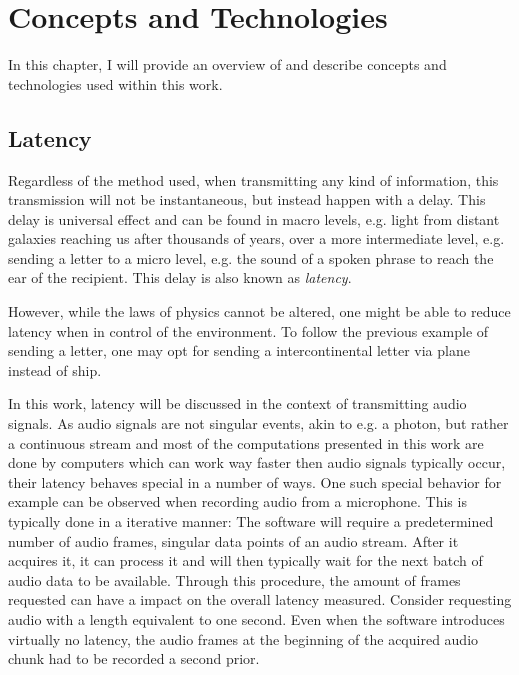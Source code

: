 

\chapter{Concepts and Technologies}
\label{basics:start}
In this chapter, I will provide an overview of and describe concepts and technologies used within this work.



\section{Latency}
\label{basics:latency}
Regardless of the method used, when transmitting any kind of information, this transmission will not be instantaneous, but instead happen with a delay.
This delay is universal effect and can be found in macro levels, e.g. light from distant galaxies reaching us after thousands of years, over a more intermediate level, e.g. sending a letter to a micro level, e.g. the sound of a spoken phrase to reach the ear of the recipient.
This delay is also known as \textit{latency}.

However, while the laws of physics cannot be altered, one might be able to reduce latency when in control of the environment.
To follow the previous example of sending a letter, one may opt for sending a intercontinental letter via plane instead of ship.

In this work, latency will be discussed in the context of transmitting audio signals.
As audio signals are not singular events, akin to e.g. a photon, but rather a continuous stream and most of the computations presented in this work are done by computers which can work way faster then audio signals typically occur, their latency behaves special in a number of ways. %
One such special behavior for example can be observed when recording audio from a microphone.
This is typically done in a iterative manner:
The software will require a predetermined number of audio frames, singular data points of an audio stream.
After it acquires it, it can process it and will then typically wait for the next batch of audio data to be available.
Through this procedure, the amount of frames requested can have a impact on the overall latency measured.
Consider requesting audio with a length equivalent to one second.
Even when the software introduces virtually no latency, the audio frames at the beginning of the acquired audio chunk had to be recorded a second prior.

